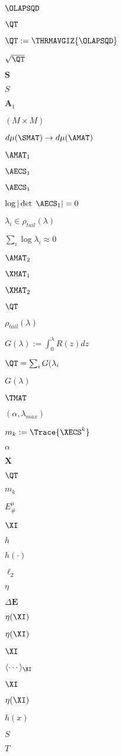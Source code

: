 $\OLAPSQD$

$\QT$

$\QT:=\THRMAVGIZ{\OLAPSQD}$

$\sqrt{\QT}$

$\mathbf{S}$

$S$

$\mathbf{A}_1$

$(M \times M)$

$d\mu(\SMAT)\rightarrow d\mu(\AMAT)$

$\AMAT_1$

$\AECS_1$

$\AECS_1$

$\log|\det\;\AECS_1|=0$

$\lambda_{i}\in\rho_{tail}(\lambda)$

$\sum_{i}\log\lambda_{i}\approx 0$

$\AMAT_2$

$\XMAT_1$

$\XMAT_2$

$\QT$

$\rho_{tail}(\lambda)$

$G(\lambda):=\int^{\lambda}_{0}R(z)dz$

$\QT=\sum_{i}G(\lambda_{i}$

$G(\lambda)$

$\TMAT$

$(\alpha, \lambda_{max})$

$m_{k}:=\Trace{\XECS^{k}}$

$\alpha$

$\mathbf{X}$

$\QT$

$m_{k}$


$E^{\mu}_{\#}$

$\XI$

$h$

$h(\cdot)$

$\ell_2$

$\eta$

$\Delta \mathbf{E}$

$\eta(\XI)$

$\eta(\XI)$

$\XI$

$\langle\cdots\rangle_{\XI}$

$\XI$

$\eta(\XI)$

$h(x)$

$S$

$T$

